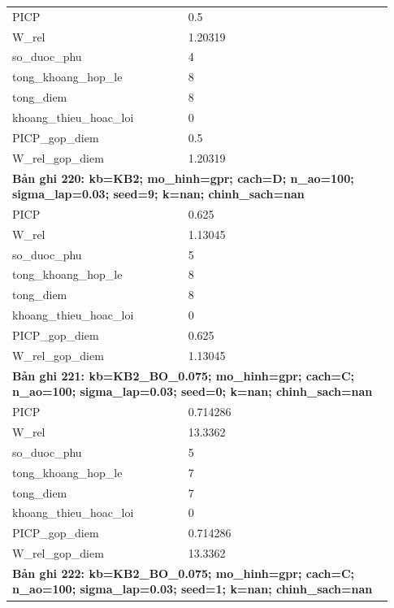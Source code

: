 \begin{longtable}{p{0.43\linewidth}p{0.50\linewidth}}
PICP & 0.5 \\
W\_\allowbreak rel & 1.20319 \\
so\_\allowbreak duoc\_\allowbreak phu & 4 \\
tong\_\allowbreak khoang\_\allowbreak hop\_\allowbreak le & 8 \\
tong\_\allowbreak diem & 8 \\
khoang\_\allowbreak thieu\_\allowbreak hoac\_\allowbreak loi & 0 \\
PICP\_\allowbreak gop\_\allowbreak diem & 0.5 \\
W\_\allowbreak rel\_\allowbreak gop\_\allowbreak diem & 1.20319 \\
\midrule
\multicolumn{2}{p{0.95\linewidth}}{\textbf{Bản ghi 220: kb=KB2; mo\_hinh=gpr; cach=D; n\_ao=100; sigma\_lap=0.03; seed=9; k=nan; chinh\_sach=nan}} \\
PICP & 0.625 \\
W\_\allowbreak rel & 1.13045 \\
so\_\allowbreak duoc\_\allowbreak phu & 5 \\
tong\_\allowbreak khoang\_\allowbreak hop\_\allowbreak le & 8 \\
tong\_\allowbreak diem & 8 \\
khoang\_\allowbreak thieu\_\allowbreak hoac\_\allowbreak loi & 0 \\
PICP\_\allowbreak gop\_\allowbreak diem & 0.625 \\
W\_\allowbreak rel\_\allowbreak gop\_\allowbreak diem & 1.13045 \\
\midrule
\multicolumn{2}{p{0.95\linewidth}}{\textbf{Bản ghi 221: kb=KB2\_BO\_0.075; mo\_hinh=gpr; cach=C; n\_ao=100; sigma\_lap=0.03; seed=0; k=nan; chinh\_sach=nan}} \\
PICP & 0.714286 \\
W\_\allowbreak rel & 13.3362 \\
so\_\allowbreak duoc\_\allowbreak phu & 5 \\
tong\_\allowbreak khoang\_\allowbreak hop\_\allowbreak le & 7 \\
tong\_\allowbreak diem & 7 \\
khoang\_\allowbreak thieu\_\allowbreak hoac\_\allowbreak loi & 0 \\
PICP\_\allowbreak gop\_\allowbreak diem & 0.714286 \\
W\_\allowbreak rel\_\allowbreak gop\_\allowbreak diem & 13.3362 \\
\midrule
\multicolumn{2}{p{0.95\linewidth}}{\textbf{Bản ghi 222: kb=KB2\_BO\_0.075; mo\_hinh=gpr; cach=C; n\_ao=100; sigma\_lap=0.03; seed=1; k=nan; chinh\_sach=nan}} \\

\end{longtable}
